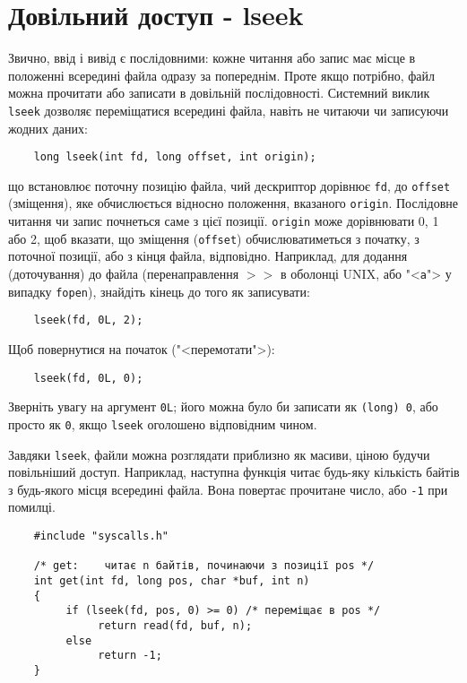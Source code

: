 \documentclass[a4paper,12pt]{book}
\begin{document}
\section{Довільний доступ - lseek}


  Звично, ввід і вивід є послідовними: кожне читання або запис має місце в положенні
  всередині файла одразу за попереднім. Проте якщо потрібно, файл можна прочитати або
  записати в довільній послідовності. Системний виклик \texttt{lseek} дозволяє
  переміщатися всередині файла, навіть не читаючи чи записуючи жодних даних:
  \begin{verbatim}
    long lseek(int fd, long offset, int origin);
  \end{verbatim}
  що встановлює поточну позицію файла, чий дескриптор дорівнює \texttt{fd}, до
  \texttt{offset} (зміщення), яке обчислюється відносно положення, вказаного
  \texttt{origin}. Послідовне читання чи запис почнеться саме з цієї позиції.
  \texttt{origin} може дорівнювати 0, 1 або 2, щоб вказати, що зміщення (\texttt{offset})
  обчислюватиметься з початку, з поточної позиції, або з кінця файла, відповідно.
  Наприклад, для додання (доточування) до файла (перенаправлення \texttt{\mbox{$>$}\mbox{$>$}} в
  оболонці UNIX, або "<\texttt{a}"> у випадку \texttt{fopen}), знайдіть кінець
  до того як записувати:
  \begin{verbatim}
    lseek(fd, 0L, 2);
  \end{verbatim}

  Щоб повернутися на початок ("<перемотати">):
  \begin{verbatim}
    lseek(fd, 0L, 0);
  \end{verbatim}

  Зверніть увагу на аргумент \texttt{0L}; його можна було би записати як \texttt{(long)
  0}, або просто як \texttt{0}, якщо \texttt{lseek} оголошено відповідним чином.

  Завдяки \texttt{lseek}, файли можна розглядати приблизно як масиви, ціною будучи
  повільніший доступ. Наприклад, наступна функція читає будь-яку кількість байтів з
  будь-якого місця всередині файла. Вона повертає прочитане число, або \texttt{-1} при
  помилці.
  \begin{verbatim}
    #include "syscalls.h"

    /* get:    читає n байтів, починаючи з позиції pos */
    int get(int fd, long pos, char *buf, int n)
    {
         if (lseek(fd, pos, 0) >= 0) /* переміщає в pos */
              return read(fd, buf, n);
         else
              return -1;
    }
  \end{verbatim}
\end{document}
